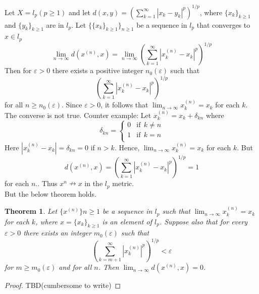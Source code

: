 \documentclass[12pt]{report}
\newtheorem{thm}{Theorem}
\theoremstyle{definition}
\begin{document}
\begin{enumerate}
    Let $X = l_p(p \geq 1)$ and let $d(x,y) = (\sum_{k=1}^{\infty}|x_k - y_k|^p)^{1/p}$, where $\{x_k\}_{k \geq 1}$ and $\{y_k\}_{k \geq 1}$ are in $l_p$. Let $\{\{x_k\}_{k\geq 1}\}_{n \geq 1}$ be a sequence in $l_p$ that converges to $x \in l_p$
    $$ \lim_{n \to \infty}d(x^{(n)}, x) = \lim_{n \to \infty}\left(\sum_{k=1}^{\infty}|x_k^{(n)} - x_k|^p\right)^{1/p}$$
    Then for $\varepsilon > 0$ there exists a positive integer $n_0(\varepsilon)$ such that $$ \left(\sum_{k=1}^{\infty}|x_k^{(n)} - x_k|^p\right)^{1/p}$$
    for all $ n \geq n_0(\varepsilon)$. Since $\varepsilon > 0$, it follows that $ \lim_{n \to \infty}x_k^{(n)} = x_k$ for each $k$.\\
    The converse is not true. Counter example: Let $x_k^{(n)} = x_k + \mathcal{\delta}_{kn}$ where 
    $$ \mathcal{\delta}_{kn} = \begin{cases}
        0 & \text{if}~~k \neq n\\
        1 & \text{if}~~k = n\\
    \end{cases} 
    $$
    Here $ |x_k^{(n)} - x_k| = \mathcal{\delta}_{kn} = 0$ if $n > k$. Hence, $\lim_{n \to \infty} x_k^{(n)} = x_k$ for each $k$. But
    $$ d(x^{(n)},x) = \left(\sum_{k=1}^{\infty}|x_k^{(n)} - x_k|^p\right)^{1/p} = 1 $$
    for each $n$.. Thus $x^n \nrightarrow x$ in the $l_p$ metric.\\
    But the below theorem holds.
\end{enumerate}
\begin{thm}
    Let $\{x^{(n)}\}{n \geq 1}$ be a sequence in $l_p$ such that $\lim_{n \to \infty}x_k^{(n)} = x_k$ for each $k$, where $x = \{x_k\}_{k \geq 1}$ is an element of $l_p$. Suppose also that for every $ \varepsilon > 0$ there exists an integer $m_0(\varepsilon)$ such that
    $$ \left(\sum\limits_{k = m+1}^{\infty} |x_k^{(n)}|^p \right)^{1/p} < \varepsilon$$ for $m \geq m_0(\varepsilon)$ and for all $n$. Then $\lim_{n \to \infty}d(x^{(n)}, x) = 0$.
\end{thm}
\begin{proof}
    TBD(cumbersome to write)
\end{proof}
\end{document}

